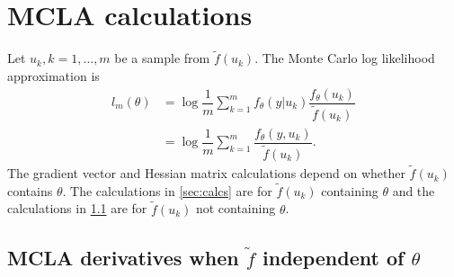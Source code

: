 \documentclass{article}
\begin{document}
\section{MCLA calculations}
Let $u_k,k=1,\ldots,m$ be a sample from $\tilde{f}(u_k)$. The Monte Carlo log likelihood approximation is
\begin{align}
l_{m}(\theta) &=\log \dfrac{1}{m} \sum_{k=1}^mf_\theta(y|u_k)  \dfrac{ f_\theta(u_k)   }{\tilde{f}(u_k)}\\
&= \log \dfrac{1}{m} \sum_{k=1}^m  \dfrac{ f_\theta(y,u_k)   }{\tilde{f}(u_k)}.
\end{align}
The gradient vector and Hessian matrix calculations depend on whether $\tilde{f}(u_k)$ contains $\theta$. The calculations in \ref{sec:calcs} are for $\tilde{f}(u_k)$ containing $\theta$ and the calculations in \ref{sec:calcsindep} are for $\tilde{f}(u_k)$ not containing $\theta$.

\subsection{MCLA derivatives when $\tilde{f}$ independent of $\theta$}\label{sec:calcsindep}
\end{document}
